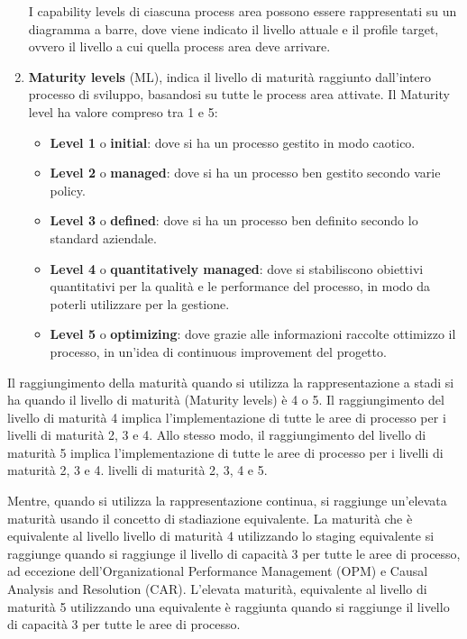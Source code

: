 \begin{enumerate}
          I capability levels di ciascuna process area possono essere rappresentati su
          un diagramma a barre, dove viene indicato il livello attuale e il profile
          target, ovvero il livello a cui quella process area deve arrivare.
    \item \textbf{Maturity levels} (ML), indica il livello di maturità raggiunto
          dall'intero processo di sviluppo, basandosi su tutte le process area attivate.
          Il Maturity level ha valore compreso tra 1 e 5:
          \begin{itemize}
              \item \textbf{Level 1} o \textbf{initial}: dove si ha un processo gestito
                    in modo caotico.
              \item \textbf{Level 2} o \textbf{managed}: dove si ha un processo ben
                    gestito secondo varie policy.
              \item \textbf{Level 3} o \textbf{defined}: dove si ha un processo ben
                    definito secondo lo standard aziendale.
              \item \textbf{Level 4} o \textbf{quantitatively managed}: dove si stabiliscono
                    obiettivi quantitativi per la qualità e le performance del processo,
                    in modo da poterli utilizzare per la gestione.
              \item \textbf{Level 5} o \textbf{optimizing}: dove grazie alle informazioni
                    raccolte ottimizzo il processo, in un'idea di continuous improvement del progetto.
          \end{itemize}
\end{enumerate}

Il raggiungimento della maturità quando si utilizza la rappresentazione a stadi
si ha quando il livello di maturità (Maturity levels) è 4 o 5. Il raggiungimento
del livello di maturità 4 implica l'implementazione di tutte le aree di processo
per i livelli di maturità 2, 3 e 4. Allo stesso modo, il raggiungimento del livello
di maturità 5 implica l'implementazione di tutte le aree di processo per i
livelli di maturità 2, 3 e 4. livelli di maturità 2, 3, 4 e 5.

Mentre, quando si utilizza la rappresentazione continua, si raggiunge un'elevata
maturità usando il concetto di stadiazione equivalente. La maturità che è
equivalente al livello livello di maturità 4 utilizzando lo staging equivalente
si raggiunge quando si raggiunge il livello di capacità 3 per tutte le aree di
processo, ad eccezione dell'Organizational Performance Management (OPM) e Causal
Analysis and Resolution (CAR). L'elevata maturità, equivalente al livello di
maturità 5 utilizzando una equivalente è raggiunta quando si raggiunge il livello
di capacità 3 per tutte le aree di processo.

